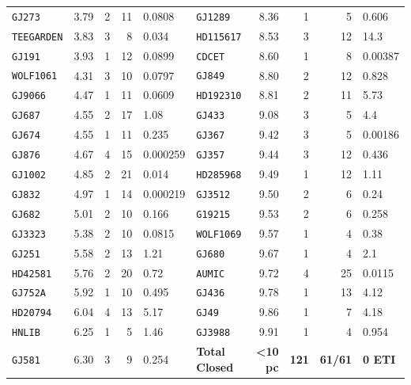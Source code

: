 \documentclass[twocolumn,10pt]{article}
\begin{document}
\begin{table}[!ht]
{\begin{tabular}{lrrrl|lrrrl}
\texttt{GJ273} & 3.79 & 2 & 11 & 0.0808 & \texttt{GJ1289} & 8.36 & 1 & 5 & 0.606 \\
\texttt{TEEGARDEN} & 3.83 & 3 & 8 & 0.034 & \texttt{HD115617} & 8.53 & 3 & 12 & 14.3 \\
\texttt{GJ191} & 3.93 & 1 & 12 & 0.0899 & \texttt{CDCET} & 8.60 & 1 & 8 & 0.00387 \\
\texttt{WOLF1061} & 4.31 & 3 & 10 & 0.0797 & \texttt{GJ849} & 8.80 & 2 & 12 & 0.828 \\
\texttt{GJ9066} & 4.47 & 1 & 11 & 0.0609 & \texttt{HD192310} & 8.81 & 2 & 11 & 5.73 \\
\texttt{GJ687} & 4.55 & 2 & 17 & 1.08 & \texttt{GJ433} & 9.08 & 3 & 5 & 4.4 \\
\texttt{GJ674} & 4.55 & 1 & 11 & 0.235 & \texttt{GJ367} & 9.42 & 3 & 5 & 0.00186 \\
\texttt{GJ876} & 4.67 & 4 & 15 & 0.000259 & \texttt{GJ357} & 9.44 & 3 & 12 & 0.436 \\
\texttt{GJ1002} & 4.85 & 2 & 21 & 0.014 & \texttt{HD285968} & 9.49 & 1 & 12 & 1.11 \\
\texttt{GJ832} & 4.97 & 1 & 14 & 0.000219 & \texttt{GJ3512} & 9.50 & 2 & 6 & 0.24 \\
\texttt{GJ682} & 5.01 & 2 & 10 & 0.166 & \texttt{G19215} & 9.53 & 2 & 6 & 0.258 \\
\texttt{GJ3323} & 5.38 & 2 & 10 & 0.0815 & \texttt{WOLF1069} & 9.57 & 1 & 4 & 0.38 \\
\texttt{GJ251} & 5.58 & 2 & 13 & 1.21 & \texttt{GJ680} & 9.67 & 1 & 4 & 2.1 \\
\texttt{HD42581} & 5.76 & 2 & 20 & 0.72 & \texttt{AUMIC} & 9.72 & 4 & 25 & 0.0115 \\
\texttt{GJ752A} & 5.92 & 1 & 10 & 0.495 & \texttt{GJ436} & 9.78 & 1 & 13 & 4.12 \\
\texttt{HD20794} & 6.04 & 4 & 13 & 5.17 & \texttt{GJ49} & 9.86 & 1 & 7 & 4.18 \\
\texttt{HNLIB} & 6.25 & 1 & 5 & 1.46 & \texttt{GJ3988} & 9.91 & 1 & 4 & 0.954 \\
\texttt{GJ581} & 6.30 & 3 & 9 & 0.254 & \textbf{Total Closed} & \textbf{<10 pc} & \textbf{121} & \textbf{61/61} & \textbf{0 ETI} \\
\bottomrule
\end{tabular}%
}
\end{table}
\clearpage
\twocolumn
\end{document}
